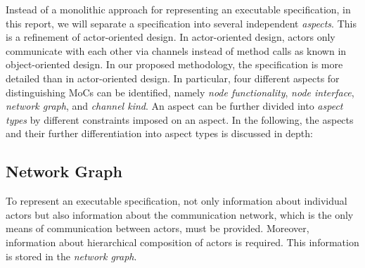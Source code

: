 
Instead of a monolithic approach for representing an executable specification,
in this report, we will separate a specification into several
independent \emph{aspects}.
This is a refinement of actor-oriented design.
In actor-oriented design, actors only
communicate with each other via channels instead of method calls as known
in object-oriented design. In our proposed methodology, the specification is more
detailed than in actor-oriented design.
In particular, four different aspects for distinguishing MoCs can be identified,
namely \emph{node functionality}, \emph{node interface}, \emph{network graph}, and
\emph{channel kind}. An aspect can be further divided into
\emph{aspect types} by different constraints imposed on an aspect.
In the following, the aspects and their further
differentiation into aspect types is discussed in depth:

\subsection{Network Graph}\label{network-graph} 

To represent an executable specification, not only information about
individual actors but also information about the communication network,
which is the only means of communication between actors,
must be provided. Moreover, information about hierarchical
composition of actors is required. This information is stored in
the \emph{network graph}.

